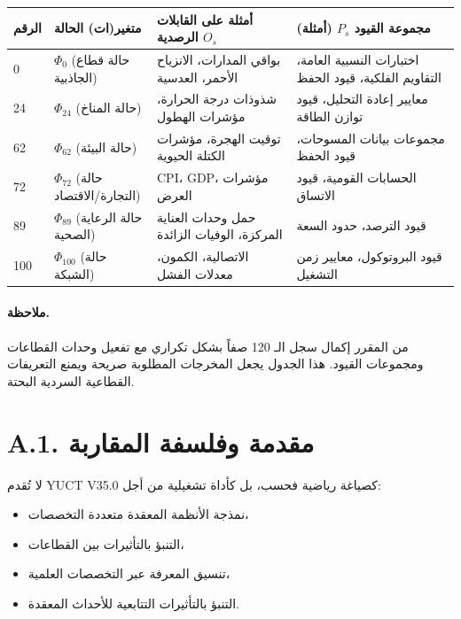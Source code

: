 \documentclass[13pt,a4paper]{article}
\begin{document}
	\begin{longtable}{|p{0.8cm}|p{4.2cm}|p{4.5cm}|p{4.7cm}|}
		\hline
		\textbf{الرقم} & \textbf{متغير(ات) الحالة} & \textbf{أمثلة على القابلات الرصدية $O_s$} & \textbf{مجموعة القيود $P_s$ (أمثلة)} \\
		\hline
		\endhead
		0 & $\Phi_0$ (حالة قطاع الجاذبية) & بواقي المدارات، الانزياح الأحمر، العدسية & اختبارات النسبية العامة، التقاويم الفلكية، قيود الحفظ \\
		\hline
		24 & $\Phi_{24}$ (حالة المناخ) & شذوذات درجة الحرارة، مؤشرات الهطول & معايير إعادة التحليل، قيود توازن الطاقة \\
		\hline
		62 & $\Phi_{62}$ (حالة البيئة) & توقيت الهجرة، مؤشرات الكتلة الحيوية & مجموعات بيانات المسوحات، قيود الحفظ \\
		\hline
		72 & $\Phi_{72}$ (حالة التجارة/الاقتصاد) & CPI، GDP، مؤشرات العرض & الحسابات القومية، قيود الاتساق \\
		\hline
		89 & $\Phi_{89}$ (حالة الرعاية الصحية) & حمل وحدات العناية المركزة، الوفيات الزائدة & قيود الترصد، حدود السعة \\
		\hline
		100 & $\Phi_{100}$ (حالة الشبكة) & الاتصالية، الكمون، معدلات الفشل & قيود البروتوكول، معايير زمن التشغيل \\
		\hline
	\end{longtable}
	
	\paragraph{ملاحظة.}
	من المقرر إكمال سجل الـ 120 صفاً بشكل تكراري مع تفعيل وحدات القطاعات ومجموعات القيود. هذا الجدول يجعل المخرجات المطلوبة صريحة ويمنع التعريفات القطاعية السردية البحتة.
	
	\section*{A.1. مقدمة وفلسفة المقاربة}
	
	لا تُقدم YUCT V35.0 كصياغة رياضية فحسب، بل كأداة تشغيلية من أجل:
	\begin{itemize}[leftmargin=*]
		\item نمذجة الأنظمة المعقدة متعددة التخصصات،
		\item التنبؤ بالتأثيرات بين القطاعات،
		\item تنسيق المعرفة عبر التخصصات العلمية،
		\item التنبؤ بالتأثيرات التتابعية للأحداث المعقدة.
	\end{itemize}
\end{document}
